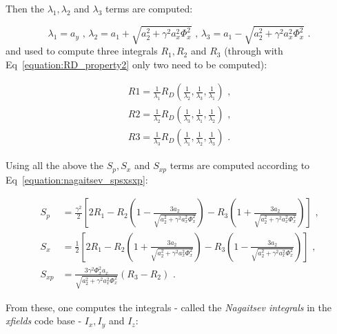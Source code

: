 Then the \(\lambda_1, \lambda_2\) and \(\lambda_3\) terms are computed:

\begin{equation}
    \lambda_1 = a_y \text{ , }
    \lambda_2 = a_1 + \sqrt{a_2^{2} + \gamma^2 a_x^{2} \Phi_x^2} \text{ , }
    \lambda_3 = a_1 - \sqrt{a_2^{2} + \gamma^2 a_x^{2} \Phi_x^2} \text{ .}
    \label{equation:nagaitsev_lambdas}
\end{equation}
and used to compute three integrals \(R_1, R_2\) and \(R_3\) (through with Eq~\eqref{equation:RD_property2} only two need to be computed):

\begin{equation}
    \begin{aligned}
        R1 = \frac{1}{\lambda_1} R_D(\frac{1}{\lambda_2}, \frac{1}{\lambda_3}, \frac{1}{\lambda_1}) \text{ ,} \\
        R2 = \frac{1}{\lambda_2} R_D(\frac{1}{\lambda_3}, \frac{1}{\lambda_1}, \frac{1}{\lambda_2}) \text{ ,} \\
        R3 = \frac{1}{\lambda_3} R_D(\frac{1}{\lambda_1}, \frac{1}{\lambda_2}, \frac{1}{\lambda_3}) \text{ .}
    \end{aligned}
    \label{equation:nagaitsev_r1r2r3}
\end{equation}

Using all the above the \(S_p, S_x\) and \(S_{xp}\) terms are computed according to Eq~\eqref{equation:nagaitsev_spsxsxp}:

\begin{equation}
    \begin{aligned}
        S_p &= \frac{\gamma^2}{2} \left[ 2 R_1 - R_2 \left(1 - \frac{3 a_2}{\sqrt{a_2^{2} + \gamma^2 a_x^{2} \Phi_x^2}}\right) - R_3 \left(1 + \frac{3 a_2}{\sqrt{a_2^{2} + \gamma^2 a_x^{2} \Phi_x^2}}\right) \right] \text{ ,} \\
        S_x &= \frac{1}{2} \left[ 2 R_1 - R_2 \left(1 + \frac{3 a_2}{\sqrt{a_2^{2} + \gamma^2 a_x^{2} \Phi_x^2}}\right) - R_3 \left(1 - \frac{3 a_2}{\sqrt{a_2^{2} + \gamma^2 a_x^{2} \Phi_x^2}}\right) \right] \text{ ,} \\
        S_{xp} &= \frac{3 \gamma^2 \Phi_x^2 a_x}{\sqrt{a_2^{2} + \gamma^2 a_x^{2} \Phi_x^2}} \left( R_3 - R_2 \right) \text{ .}
    \end{aligned}
    \label{equation:nagaitsev_spsxsxp}
\end{equation}

From these, one computes the integrals - called the \textit{Nagaitsev integrals} in the \textit{xfields} code base - \(I_x, I_y\) and \(I_z\):

